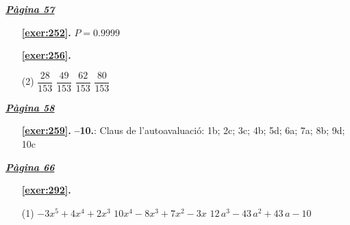 
\hyperlink{page.57}{\textbf{\em Pàgina 57}}
\begin{enumerate}
\item[\fontfamily{phv}\selectfont\color{blue}\textbf{\ref{exer:252}. }] \label{ans:252} 
$P=0.9999$
 \end{enumerate}
\begin{enumerate}



 \item[\fontfamily{phv}\selectfont\color{blue}\textbf{\ref{exer:256}. }] \label{ans:256}
 \begin{tasks}[column-sep=1em, item-indent=1.3333em](2)
	 \task $\dfrac {28}{153}$
	 \task $\dfrac {49}{153}$
	 \task $\dfrac {62}{153}$
	 \task $\dfrac {80}{153}$
\end{tasks}
 \end{enumerate}
\vspace{0.3cm}


\hyperlink{page.58}{\textbf{\em Pàgina 58}}
\begin{enumerate}
\item[\fontfamily{phv}\selectfont\color{blue}\textbf{\ref{exer:259}. }] \label{ans:259} 
\textbf {--10.}: Claus de l'autoavaluació: 1b; 2c; 3c; 4b; 5d; 6a; 7a; 8b; 9d; 10c
 \end{enumerate}

 \vspace{1cm} 
 

\vspace{0.3cm}


\hyperlink{page.66}{\textbf{\em Pàgina 66}}
\begin{enumerate}



 \item[\fontfamily{phv}\selectfont\color{blue}\textbf{\ref{exer:292}. }] \label{ans:292}
 \begin{tasks}[column-sep=1em, item-indent=1.3333em](1)
	 \task $-3x^5+4x^4+2x^3$
	 \task $10x^4-8x^3+7x^2-3x$
	 \task $12\,a^3-43\,a^2+43\,a-10$
\end{tasks}
 \end{enumerate}
\vspace{0.3cm}

